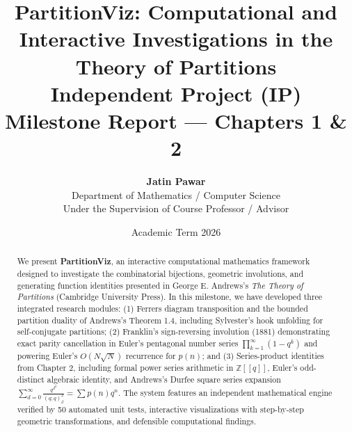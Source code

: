 \documentclass[11pt,a4paper]{article}
\title{\textbf{PartitionViz: Computational and Interactive Investigations in the Theory of Partitions}\\
\large Independent Project (IP) Milestone Report --- Chapters 1 \& 2}
\author{\textbf{Jatin Pawar}\\
Department of Mathematics / Computer Science\\
Under the Supervision of Course Professor / Advisor}
\date{Academic Term 2026}
\begin{document}
\maketitle

\begin{abstract}
We present \textbf{PartitionViz}, an interactive computational mathematics framework designed to investigate the combinatorial bijections, geometric involutions, and generating function identities presented in George E. Andrews's \emph{The Theory of Partitions} (Cambridge University Press). In this milestone, we have developed three integrated research modules: (1) Ferrers diagram transposition and the bounded partition duality of Andrews's Theorem 1.4, including Sylvester's hook unfolding for self-conjugate partitions; (2) Franklin's sign-reversing involution (1881) demonstrating exact parity cancellation in Euler's pentagonal number series $\prod_{k=1}^\infty (1-q^k)$ and powering Euler's $O(N\sqrt{N})$ recurrence for $p(n)$; and (3) Series-product identities from Chapter 2, including formal power series arithmetic in $\mathbb{Z}[[q]]$, Euler's odd-distinct algebraic identity, and Andrews's Durfee square series expansion $\sum_{d=0}^\infty \frac{q^{d^2}}{(q; q)_d^2} = \sum p(n) q^n$. The system features an independent mathematical engine verified by 50 automated unit tests, interactive visualizations with step-by-step geometric transformations, and defensible computational findings.
\end{abstract}
\end{document}

